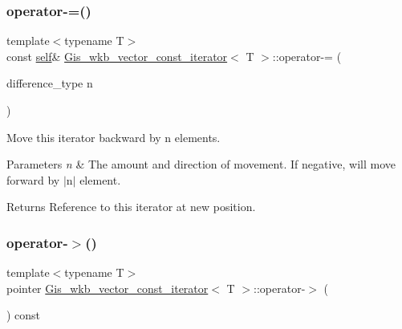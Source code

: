 \subsubsection{\texorpdfstring{operator-\/=()}{operator-=()}}
{\footnotesize\ttfamily template$<$typename T$>$ \\
const \mbox{\hyperlink{classGis__wkb__vector__const__iterator}{self}}\& \mbox{\hyperlink{classGis__wkb__vector__const__iterator}{Gis\+\_\+wkb\+\_\+vector\+\_\+const\+\_\+iterator}}$<$ T $>$\+::operator-\/= (\begin{DoxyParamCaption}\item[{difference\+\_\+type}]{n }\end{DoxyParamCaption})\hspace{0.3cm}{\ttfamily [inline]}}



Move this iterator backward by n elements. 


\begin{DoxyParams}{Parameters}
{\em n} & The amount and direction of movement. If negative, will move forward by $\vert$n$\vert$ element. \\
\hline
\end{DoxyParams}
\begin{DoxyReturn}{Returns}
Reference to this iterator at new position. 
\end{DoxyReturn}
\mbox{\label{classGis__wkb__vector__const__iterator_ab3b5df309bab51f282585f5cb92cc82f}} 
\subsubsection{\texorpdfstring{operator-\/$>$()}{operator->()}}
{\footnotesize\ttfamily template$<$typename T$>$ \\
pointer \mbox{\hyperlink{classGis__wkb__vector__const__iterator}{Gis\+\_\+wkb\+\_\+vector\+\_\+const\+\_\+iterator}}$<$ T $>$\+::operator-\/$>$ (\begin{DoxyParamCaption}{ }\end{DoxyParamCaption}) const\hspace{0.3cm}{\ttfamily [inline]}}



